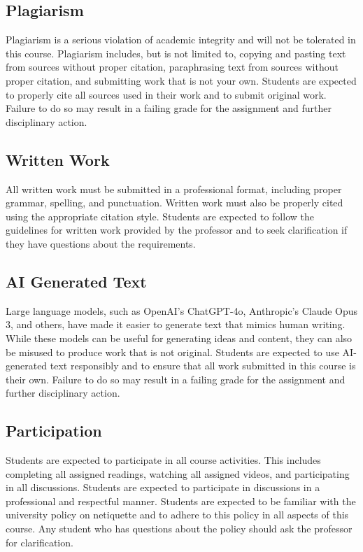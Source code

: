 \documentclass[11pt, letterpaper]{article}
\begin{document}
\subsection*{Plagiarism}
Plagiarism is a serious violation of academic integrity and will not be tolerated in this course. Plagiarism includes, but is not limited to, copying and pasting text from sources without proper citation, paraphrasing text from sources without proper citation, and submitting work that is not your own. Students are expected to properly cite all sources used in their work and to submit original work. Failure to do so may result in a failing grade for the assignment and further disciplinary action.

\subsection*{Written Work}
All written work must be submitted in a professional format, including proper grammar, spelling, and punctuation. Written work must also be properly cited using the appropriate citation style. Students are expected to follow the guidelines for written work provided by the professor and to seek clarification if they have questions about the requirements.

\subsection*{AI Generated Text} 
Large language models, such as OpenAI's ChatGPT-4o, Anthropic's Claude Opus 3, and others, have made it easier to generate text that mimics human writing. While these models can be useful for generating ideas and content, they can also be misused to produce work that is not original. Students are expected to use AI-generated text responsibly and to ensure that all work submitted in this course is their own. Failure to do so may result in a failing grade for the assignment and further disciplinary action.

\subsection*{Participation}

Students are expected to participate in all course activities. This includes completing all assigned readings, watching all assigned videos, and participating in all discussions. Students are expected to participate in discussions in a professional and respectful manner. Students are expected to be familiar with the university policy on netiquette and to adhere to this policy in all aspects of this course. Any student who has questions about the policy should ask the professor for clarification. 
\end{document}
